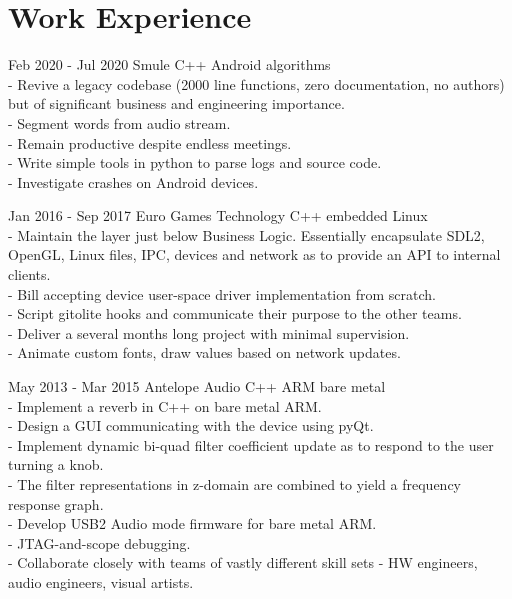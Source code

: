 \documentclass{tccv}
\begin{document}
\pagebreak
\section{Work Experience}
\begin{eventlist}
\item{Feb 2020 - Jul 2020}
     {Smule}
     {C++ Android algorithms}  \\
- Revive a legacy codebase (2000 line functions, zero documentation, no authors) but of significant business and engineering importance.  \\
- Segment words from audio stream.  \\
- Remain productive despite endless meetings.  \\
- Write simple tools in python to parse logs and source code.  \\
- Investigate crashes on Android devices.  \\

\item{Jan 2016 - Sep 2017}
     {Euro Games Technology}
     {C++ embedded Linux}  \\
- Maintain the layer just below Business Logic.
  Essentially encapsulate SDL2, OpenGL, Linux files, IPC, devices and network as to provide an API to internal clients.  \\
- Bill accepting device user-space driver implementation from scratch.  \\
- Script gitolite hooks and communicate their purpose to the other teams.  \\
- Deliver a several months long project with minimal supervision.  \\
- Animate custom fonts, draw values based on network updates.  \\

\item{May 2013 - Mar 2015}
     {Antelope Audio}
     {C++ ARM bare metal}  \\
- Implement a reverb in C++ on bare metal ARM.  \\
- Design a GUI communicating with the device using pyQt.  \\
- Implement dynamic bi-quad filter coefficient update as to respond to the user turning a knob.  \\
- The filter representations in z-domain are combined to yield a frequency response graph.  \\
- Develop USB2 Audio mode firmware for bare metal ARM.  \\
- JTAG-and-scope debugging.  \\
- Collaborate closely with teams of vastly different skill sets - HW engineers, audio engineers, visual artists.  \\


\end{eventlist}
\end{document}
